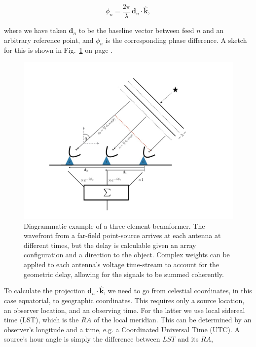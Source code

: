\begin{equation}
\label{eqn-phi_n}
\phi_n = \frac{2\pi}{\lambda} \, \mathbf{d}_n \cdot  {\mathbf{\hat{k}}},
\end{equation}

\noindent where we have taken $\mathbf{d}_n$ to be the baseline vector between 
feed $n$ and an arbitrary reference point, and $\phi_n$ is the corresponding 
phase difference. A sketch for this is shown in 
Fig.~\ref{fig-bf_diagram} on page 
\pageref{fig-bf_diagram}.


\begin{figure}[!h]
\begin{center}
\includegraphics[trim={1.in, 1.in, 2.5in, 1.in}, width=1\textwidth]{./figures/beamforming/beamforming_diagram.jpeg} 
\vspace{0.0cm}
\caption[abc]{Diagrammatic example of a three-element beamformer. The 
wavefront from a far-field point-source arrives at each antenna 
at different times, but the delay is calculable given an array 
configuration and a direction to the object. Complex weights can 
be applied to each antenna's voltage time-stream to account 
for the geometric delay, allowing for the signals to be summed coherently.}
\label{fig-bf_diagram}  
\vspace{-0cm}   
\end{center}
\end{figure}

To calculate the projection $\mathbf{d}_n \cdot  {\mathbf{\hat{k}}}$, we 
need to go from celestial coordinates, in this case equatorial, to geographic 
coordinates. This requires only a source location, an observer location, and an 
observing time. For the latter we use local 
sidereal time (LST), which is the $RA$ of the local meridian. This can be determined  
by an observer's longitude and a time, e.g. a Coordinated Universal Time (UTC). 
A source's hour angle is simply the difference between $LST$ and its $RA$,

